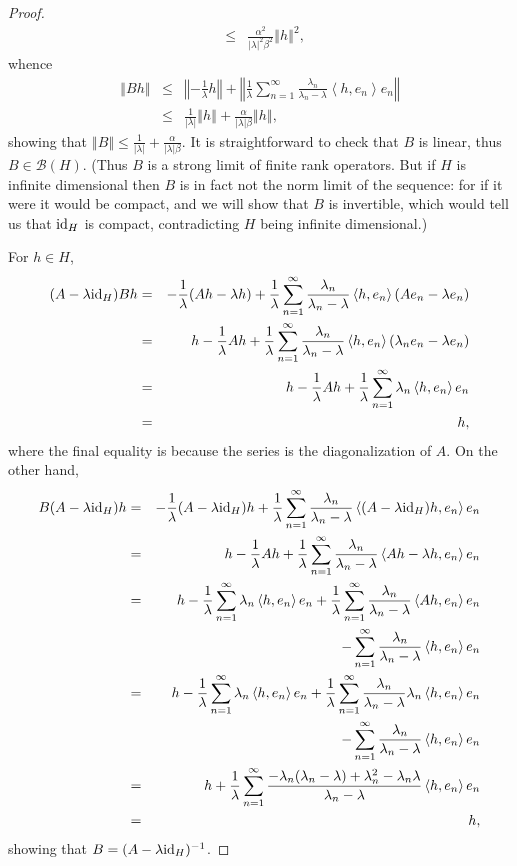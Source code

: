 \documentclass{article}
\newcommand{\inner}[2]{\left\langle #1, #2 \right\rangle}
\newcommand{\id}{\ensuremath\mathrm{id}}
\newcommand{\norm}[1]{\left\Vert #1 \right\Vert}
\theoremstyle{definition}
\begin{document}
\begin{proof}
\begin{eqnarray*}
&\leq&\frac{\alpha^2}{|\lambda|^2 \beta^2} \norm{h}^2,
\end{eqnarray*}
whence
\begin{eqnarray*}
\norm{Bh} &\leq& \norm{-\frac{1}{\lambda}h} + \norm{\frac{1}{\lambda} \sum_{n=1}^\infty \frac{\lambda_n}{\lambda_n-\lambda} \inner{h}{e_n}e_n}\\
&\leq&\frac{1}{|\lambda|} \norm{h} + \frac{\alpha}{|\lambda|\beta} \norm{h},
\end{eqnarray*}
showing that $\norm{B} \leq \frac{1}{|\lambda|} + \frac{\alpha}{|\lambda| \beta}$. It is straightforward to check that $B$ is linear, thus
$B \in \mathscr{B}(H)$. (Thus $B$ is a strong limit of finite rank operators. But if $H$ is infinite dimensional then $B$ is in fact not the norm limit of the sequence: for
if it were it would be compact, and we will show that $B$ is invertible, which would tell us that $\id_H$ is compact, contradicting $H$ being infinite dimensional.)

For $h \in H$, 
\begin{eqnarray*}
(A-\lambda \id_H)Bh&=&-\frac{1}{\lambda}(Ah-\lambda h) + \frac{1}{\lambda} \sum_{n=1}^\infty \frac{\lambda_n}{\lambda_n-\lambda}
\inner{h}{e_n}(Ae_n-\lambda e_n)\\
&=&h-\frac{1}{\lambda}Ah + \frac{1}{\lambda} \sum_{n=1}^\infty \frac{\lambda_n}{\lambda_n-\lambda}
\inner{h}{e_n}(\lambda_n e_n-\lambda e_n)\\
&=&h-\frac{1}{\lambda} Ah + \frac{1}{\lambda} \sum_{n=1}^\infty \lambda_n \inner{h}{e_n}e_n\\
&=&h,
\end{eqnarray*}
where the final equality is because the series is the diagonalization of $A$. On the other hand,
\begin{eqnarray*}
B(A-\lambda \id_H)h&=&-\frac{1}{\lambda}(A-\lambda \id_H)h + \frac{1}{\lambda} \sum_{n=1}^\infty
 \frac{\lambda_n}{\lambda_n-\lambda} \inner{(A-\lambda \id_H)h}{e_n}e_n\\
 &=&h-\frac{1}{\lambda}Ah + \frac{1}{\lambda} \sum_{n=1}^\infty
 \frac{\lambda_n}{\lambda_n-\lambda} \inner{Ah-\lambda h}{e_n}e_n\\
 &=&h-\frac{1}{\lambda}\sum_{n=1}^\infty \lambda_n \inner{h}{e_n}e_n+\frac{1}{\lambda}\sum_{n=1}^\infty \frac{\lambda_n}{\lambda_n-\lambda}
 \inner{Ah}{e_n}e_n\\
 &&-\sum_{n=1}^\infty \frac{\lambda_n}{\lambda_n-\lambda} \inner{h}{e_n}e_n\\
 &=&h-\frac{1}{\lambda}\sum_{n=1}^\infty \lambda_n \inner{h}{e_n}e_n+\frac{1}{\lambda}\sum_{n=1}^\infty \frac{\lambda_n}{\lambda_n-\lambda}
\lambda_n \inner{h}{e_n}e_n\\
 &&-\sum_{n=1}^\infty \frac{\lambda_n}{\lambda_n-\lambda} \inner{h}{e_n}e_n\\
 &=&h+\frac{1}{\lambda} \sum_{n=1}^\infty \frac{-\lambda_n(\lambda_n-\lambda) +\lambda_n^2-\lambda_n \lambda}{\lambda_n-\lambda}
 \inner{h}{e_n}e_n\\
 &=&h,
\end{eqnarray*}
showing that $B=(A-\lambda \id_H)^{-1}$.
\end{proof}
\end{document}
